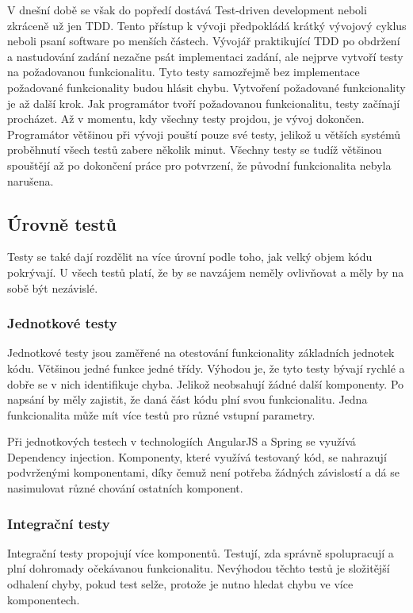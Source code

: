 \documentclass[czech,master,public,dept460,male,cpdeclaration,twoside]{diploma}
\begin{document}
V dnešní době se však do popředí dostává Test-driven development neboli zkráceně už jen TDD. Tento přístup k vývoji předpokládá krátký vývojový cyklus neboli psaní software po menších částech. Vývojář praktikující TDD po obdržení a nastudování zadání nezačne psát implementaci zadání, ale nejprve vytvoří testy na požadovanou funkcionalitu. Tyto testy samozřejmě bez implementace požadované funkcionality budou hlásit chybu. Vytvoření požadované funkcionality je až další krok. Jak programátor tvoří požadovanou funkcionalitu, testy začínají procházet. Až v momentu, kdy všechny testy projdou, je vývoj dokončen. Programátor většinou při vývoji pouští pouze své testy, jelikož u větších systémů proběhnutí všech testů zabere několik minut. Všechny testy se tudíž většinou spouštějí až po dokončení práce pro potvrzení, že původní funkcionalita nebyla narušena.

\subsection{Úrovně testů}
Testy se také dají rozdělit na více úrovní podle toho, jak velký objem kódu pokrývají. U všech testů platí, že by se navzájem neměly ovlivňovat a měly by na sobě být nezávislé.

\subsubsection{Jednotkové testy}
Jednotkové testy jsou zaměřené na otestování funkcionality základních jednotek kódu. Většinou jedné funkce jedné třídy. Výhodou je, že tyto testy bývají rychlé a dobře se v nich identifikuje chyba. Jelikož neobsahují žádné další komponenty. Po napsání by měly zajistit, že daná část kódu plní svou funkcionalitu. Jedna funkcionalita může mít více testů pro různé vstupní parametry.

Při jednotkových testech v technologiích AngularJS a Spring se využívá Dependency injection. Komponenty, které využívá testovaný kód, se nahrazují podvrženými komponentami, díky čemuž není potřeba žádných závislostí a dá se nasimulovat různé chování ostatních komponent.

\subsubsection{Integrační testy}
Integrační testy propojují více komponentů. Testují, zda správně spolupracují a plní dohromady očekávanou funkcionalitu. Nevýhodou těchto testů je složitější odhalení chyby, pokud test selže, protože je nutno hledat chybu ve více komponentech. 
\end{document}
